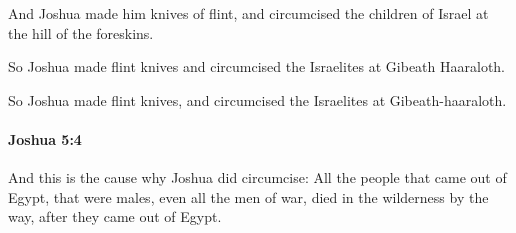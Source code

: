 			\begin{versebox}
					\item[BHS] 
					\item[ASV] And Joshua made him knives of flint, and circumcised the children of Israel at the hill of the foreskins.
					\item[NIV] So Joshua made flint knives and circumcised the Israelites at Gibeath Haaraloth.
					\item[NRSV] So Joshua made flint knives, and circumcised the Israelites at Gibeath-haaraloth.
			\end{versebox}

		\paragraph{Joshua 5:4} %
			\label{JOSHUA-5-4}

			And this is the cause why Joshua did circumcise: All the people that came out of Egypt, that were males, even all the men of war, died in the wilderness by the way, after they came out of Egypt.

